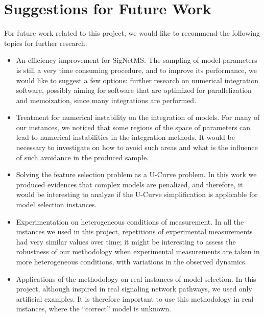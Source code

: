 \section{Suggestions for Future Work}
For future work related to this project, we would like to recommend the
following topics for further research:
\begin{itemize}
    \item{An efficiency improvement for SigNetMS.} The sampling of model
        parameters is still a very time consuming procedure, and to
        improve its performance, we would like to suggest a few options:
        further research on numerical integration software, possibly
        aiming for software that are optimized for parallelization and
        memoization, since many integrations are performed.
    \item{Treatment for numerical instability on the integration of
        models. For many of our instances, we noticed that some regions
        of the space of parameters can lead to numerical instabilities
        in the integration methods. It would be necessary to investigate
        on how to avoid such areas and what is the influence of such
        avoidance in the produced sample.}
    \item{Solving the feature selection problem as a U-Curve problem. In
        this work we produced evidences that complex models are
        penalized, and therefore, it would be interesting to analyze if
        the U-Curve simplification is applicable for model selection
        instances.}
    \item{Experimentation on heterogeneous conditions of measurement. In
        all the instances we used in this project, repetitions of 
        experimental measurements had very similar values over time; it
        might be interesting to assess the robustness of our methodology
        when experimental measurements are taken in more heterogeneous
        conditions, with variations in the observed dynamics.}
    \item{Applications of the methodology on real instances of model
        selection. In this project, although inspired in real signaling
        network pathways, we used only artificial examples. It is
        therefore important to use this methodology in real instances,
        where the ``correct'' model is unknown.}
\end{itemize}
